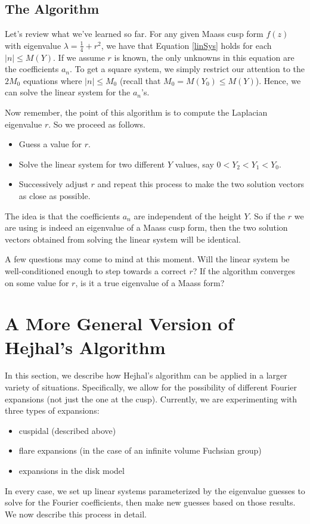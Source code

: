 \documentclass[]{article}
\begin{document}
\subsection*{The Algorithm}

Let's review what we've learned so far.
For any given Maass cusp form $f(z)$ with eigenvalue $\lambda = \frac{1}{4} + r^2$, we have that Equation \ref{linSys} holds for each $|n| \leq M(Y)$.
If we assume $r$ is known, the only unknowns in this equation are the coefficients $a_n$.
To get a square system, we simply restrict our attention to the $2M_0$ equations where $|n| \leq M_0$ (recall that $M_0 = M(Y_0) \leq M(Y)$).
Hence, we can solve the linear system for the $a_n$'s.

Now remember, the point of this algorithm is to compute the Laplacian eigenvalue $r$.
So we proceed as follows.
\begin{itemize}
	\item Guess a value for $r$.
	\item Solve the linear system for two different $Y$ values, say $0 < Y_2 < Y_1 < Y_0$.
	\item Successively adjust $r$ and repeat this process to make the two solution vectors as close as possible.
\end{itemize}
The idea is that the coefficients $a_n$ are independent of the height $Y$.
So if the $r$ we are using is indeed an eigenvalue of a Maass cusp form, then the two solution vectors obtained from solving the linear system will be identical.

A few questions may come to mind at this moment.
Will the linear system be well-conditioned enough to step towards a correct $r$?
If the algorithm converges on some value for $r$, is it a true eigenvalue of a Maass form?

\section*{A More General Version of Hejhal's Algorithm}

In this section, we describe how Hejhal's algorithm can be applied in a larger variety of situations.
Specifically, we allow for the possibility of different Fourier expansions (not just the one at the cusp).
Currently, we are experimenting with three types of expansions:
\begin{itemize}
	\item cuspidal (described above)
	\item flare expansions (in the case of an infinite volume Fuchsian group)
	\item expansions in the disk model
\end{itemize}
In every case, we set up linear systems parameterized by the eigenvalue guesses to solve for the Fourier coefficients, then make new guesses based on those results.
We now describe this process in detail.
\end{document}

